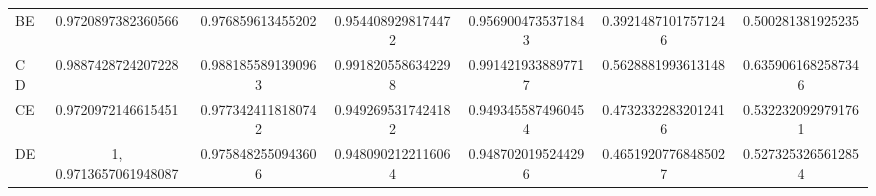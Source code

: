 \documentclass[a4paper]{article}
\begin{document}
\begin{table}[H]
{\begin{tabular}{lcccccc}
                BE               & 0.9720897382360566                                                                         & 0.976859613455202                                                                           & 0.9544089298174472                                                                            & 0.9569004735371843                                                                             & 0.39214871017571246                                                                            & 0.500281381925235                                                                               \\
                CD               & 0.9887428724207228                                                                         & 0.9881855891390963                                                                          & 0.9918205586342298                                                                            & 0.9914219338897717                                                                             & 0.5628881993613148                                                                             & 0.6359061682587346                                                                              \\
                CE               & 0.9720972146615451                                                                         & 0.9773424118180742                                                                          & 0.9492695317424182                                                                            & 0.9493455874960454                                                                             & 0.47323322832012416                                                                            & 0.5322320929791761                                                                              \\
                DE               & 1, 0.9713657061948087                                                                      & 0.9758482550943606                                                                          & 0.9480902122116064                                                                            & 0.9487020195244296                                                                             & 0.46519207768485027                                                                            & 0.5273253265612854                                                                             
                \end{tabular}
            }    
            \end{table}
            
\end{document}
